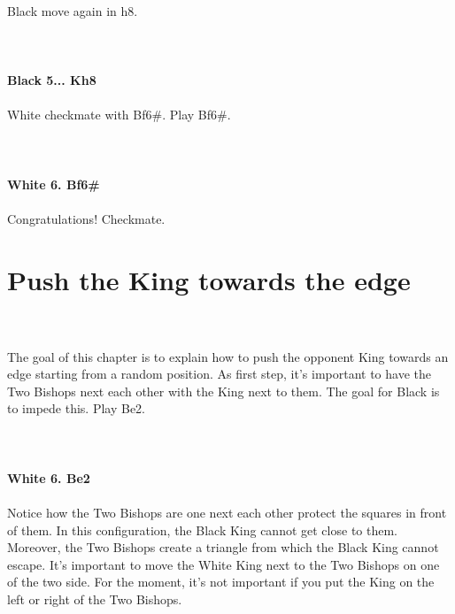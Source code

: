 \documentclass{article}
\begin{document}
\\
Black move again in h8.\\
\\

\\
\\
\textbf{Black 5... Kh8}\\
\\
White checkmate with Bf6\#. Play Bf6\#.\\
\\

\\
\\
\textbf{White 6. Bf6\#}\\
\\
Congratulations! Checkmate.\section{ Push the King towards the edge}

\\
\\
The goal of this chapter is to explain how to push the opponent King towards an edge starting from a random position. As first step, it's important to have the Two Bishops next each other with the King next to them. The goal for Black is to impede this. Play Be2.\\
\\

\\
\\
\textbf{White 6. Be2}\\
\\
Notice how the Two Bishops are one next each other protect the squares in front of them. In this configuration, the Black King cannot get close to them. Moreover, the Two Bishops create a triangle from which the Black King cannot escape. It's important to move the White King next to the Two Bishops on one of the two side. For the moment, it's not important if you put the King on the left or right of the Two Bishops.\\\\
\\

\\
\\
\end{document}
